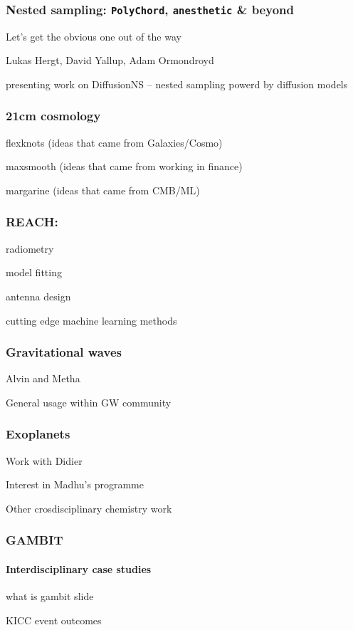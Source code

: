 \documentclass[aspectratio=169]{beamer}
\begin{document}
\begin{frame}
    \frametitle{Nested sampling: \texttt{PolyChord}, \texttt{anesthetic} \& beyond}
    Let's get the obvious one out of the way

    Lukas Hergt, David Yallup, Adam Ormondroyd

    presenting work on DiffusionNS -- nested sampling powerd by diffusion models
\end{frame}

\begin{frame}
    \frametitle{21cm cosmology}

    flexknots (ideas that came from Galaxies/Cosmo)

    maxsmooth (ideas that came from working in finance)

    margarine (ideas that came from CMB/ML)
\end{frame}

\begin{frame}
    \frametitle{REACH:}

    radiometry

    model fitting

    antenna design

    cutting edge machine learning methods
\end{frame}

\begin{frame}
    \frametitle{Gravitational waves}
    Alvin and Metha

    General usage within GW community
\end{frame}

\begin{frame}
    \frametitle{Exoplanets}
    Work with Didier

    Interest in Madhu's programme

    Other crosdisciplinary chemistry work 
\end{frame}

\begin{frame}
    \frametitle{GAMBIT}
    \framesubtitle{Interdisciplinary case studies}
    what is gambit slide

    KICC event outcomes
\end{frame}
\end{document}
